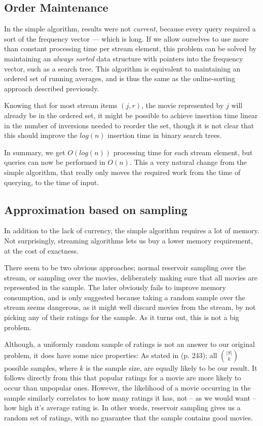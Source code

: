 \subsection*{Order Maintenance}
In the simple algorithm, results were not \textit{current}, because every query
required a sort of the frequency vector --- which is long. If we allow ourselves
to use more than constant processing time per stream element, this problem can
be solved by maintaining an \textit{always sorted} data structure with pointers
into the frequency vector, such as a search tree.
This algorithm is equivalent to maintaining an ordered set of running averages,
and is thus the same as the online-sorting approach described previously.

Knowing that for most stream items $(j,r)$, the movie represented by
$j$ will already be in the ordered set, it might be possible to achieve
insertion time linear in the number of inversions needed to reorder the set,
though it is not clear that this should improve the $log(n)$ insertion time in
binary search trees.

In summary, we get $O(log(n))$ processing time for each stream element, but
queries can now be performed in $O(n)$. This a very natural change from the
simple algorithm, that really only moves the required work from the time of
querying, to the time of input.

\subsection*{Approximation based on sampling}
In addition to the lack of currency, the simple algorithm requires a lot of
memory. Not surprisingly, streaming algorithms lets us buy a lower memory
requirement, at the cost of exactness.

There seem to be two obvious approaches;
normal reservoir sampling over the stream, or sampling over the
movies, deliberately making sure that all movies are represented in the sample.
The later obviously fails to improve memory consumption, and is only suggested
because taking a random sample over the stream seems dangerous, as it might well
discard movies from the stream, by not picking any of their ratings for the
sample. As it turns out, this is not a big problem.

Although, a uniformly random sample of ratings is not an answer to our original
problem, it does have some nice properties: As stated in
 (p. 243); all $|S| \choose k$ possible
samples, where $k$ is the sample size, are equally likely to be our result. It
follows directly from this that popular ratings for a movie are more likely to
occur than unpopular ones. However, the likelihood of a movie occurring in the
sample similarly correlates to how many ratings it has, not -- as we would want
-- how high it's average rating is. In other words, reservoir sampling gives us
a random set of ratings, with no guarantee that the sample contains good movies.

